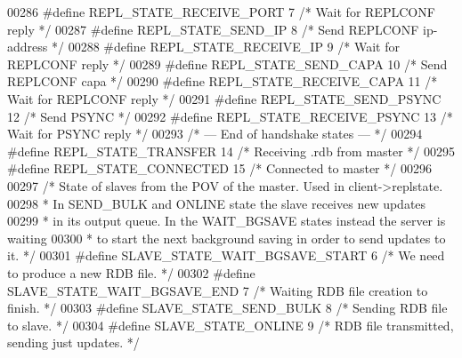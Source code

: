 \begin{DoxyCode}
{{{{{{00286 \textcolor{preprocessor}{#}\textcolor{preprocessor}{define} \textcolor{preprocessor}{REPL\_STATE\_RECEIVE\_PORT} 7 \textcolor{comment}{/* Wait for REPLCONF reply */}
00287 \textcolor{preprocessor}{#}\textcolor{preprocessor}{define} \textcolor{preprocessor}{REPL\_STATE\_SEND\_IP} 8 \textcolor{comment}{/* Send REPLCONF ip-address */}
00288 \textcolor{preprocessor}{#}\textcolor{preprocessor}{define} \textcolor{preprocessor}{REPL\_STATE\_RECEIVE\_IP} 9 \textcolor{comment}{/* Wait for REPLCONF reply */}
00289 \textcolor{preprocessor}{#}\textcolor{preprocessor}{define} \textcolor{preprocessor}{REPL\_STATE\_SEND\_CAPA} 10 \textcolor{comment}{/* Send REPLCONF capa */}
00290 \textcolor{preprocessor}{#}\textcolor{preprocessor}{define} \textcolor{preprocessor}{REPL\_STATE\_RECEIVE\_CAPA} 11 \textcolor{comment}{/* Wait for REPLCONF reply */}
00291 \textcolor{preprocessor}{#}\textcolor{preprocessor}{define} \textcolor{preprocessor}{REPL\_STATE\_SEND\_PSYNC} 12 \textcolor{comment}{/* Send PSYNC */}
00292 \textcolor{preprocessor}{#}\textcolor{preprocessor}{define} \textcolor{preprocessor}{REPL\_STATE\_RECEIVE\_PSYNC} 13 \textcolor{comment}{/* Wait for PSYNC reply */}
00293 \textcolor{comment}{/* --- End of handshake states --- */}
00294 \textcolor{preprocessor}{#}\textcolor{preprocessor}{define} \textcolor{preprocessor}{REPL\_STATE\_TRANSFER} 14 \textcolor{comment}{/* Receiving .rdb from master */}
00295 \textcolor{preprocessor}{#}\textcolor{preprocessor}{define} \textcolor{preprocessor}{REPL\_STATE\_CONNECTED} 15 \textcolor{comment}{/* Connected to master */}
00296 
00297 \textcolor{comment}{/* State of slaves from the POV of the master. Used in client->replstate.}
00298 \textcolor{comment}{ * In SEND\_BULK and ONLINE state the slave receives new updates}
00299 \textcolor{comment}{ * in its output queue. In the WAIT\_BGSAVE states instead the server is waiting}
00300 \textcolor{comment}{ * to start the next background saving in order to send updates to it. */}
00301 \textcolor{preprocessor}{#}\textcolor{preprocessor}{define} \textcolor{preprocessor}{SLAVE\_STATE\_WAIT\_BGSAVE\_START} 6 \textcolor{comment}{/* We need to produce a new RDB file. */}
00302 \textcolor{preprocessor}{#}\textcolor{preprocessor}{define} \textcolor{preprocessor}{SLAVE\_STATE\_WAIT\_BGSAVE\_END} 7 \textcolor{comment}{/* Waiting RDB file creation to finish. */}
00303 \textcolor{preprocessor}{#}\textcolor{preprocessor}{define} \textcolor{preprocessor}{SLAVE\_STATE\_SEND\_BULK} 8 \textcolor{comment}{/* Sending RDB file to slave. */}
00304 \textcolor{preprocessor}{#}\textcolor{preprocessor}{define} \textcolor{preprocessor}{SLAVE\_STATE\_ONLINE} 9 \textcolor{comment}{/* RDB file transmitted, sending just updates. */}
}}}}}}
\end{DoxyCode}
